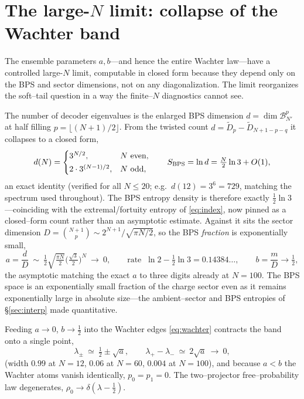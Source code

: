 \documentclass[11pt]{article}
\begin{document}
\section{The large-$N$ limit: collapse of the Wachter band}
\label{sec:largeN}

The ensemble parameters $a,b$---and hence the entire Wachter law---have a controlled large-$N$ limit,
computable in closed form because they depend only on the BPS and sector dimensions, not on any
diagonalization. The limit reorganizes the soft--tail question in a way the finite--$N$ diagnostics
cannot see.

The number of decoder eigenvalues is the enlarged BPS dimension $d=\dim\mathcal B_{N'}^p$ at half
filling $p=\lfloor(N+1)/2\rfloor$. From the twisted count $d=\widetilde D_p-\widetilde D_{N+1-p-q}$ it
collapses to a closed form,
\begin{equation}
  d(N)=\begin{cases}3^{N/2}, & N\ \text{even},\\[2pt] 2\cdot 3^{(N-1)/2}, & N\ \text{odd},\end{cases}
  \qquad S_{\rm BPS}=\ln d=\tfrac{N}{2}\ln 3+O(1),
  \label{eq:dclosed}
\end{equation}
an exact identity (verified for all $N\le20$; e.g.\ $d(12)=3^6=729$, matching the spectrum used
throughout). The BPS entropy density is therefore exactly $\tfrac12\ln3$---coinciding with the
extremal/fortuity entropy of \eqref{eq:index}, now pinned as a closed--form count rather than an
asymptotic estimate. Against it sits the sector dimension $D=\binom{N+1}{p}\sim2^{N+1}/\sqrt{\pi N/2}$,
so the BPS \emph{fraction} is exponentially small,
\begin{equation}
  a=\frac{d}{D}\ \sim\ \tfrac12\sqrt{\tfrac{\pi N}{2}}\Big(\tfrac{\sqrt3}{2}\Big)^{N}\ \longrightarrow\ 0,
  \qquad\text{rate }\ \ln2-\tfrac12\ln3=0.14384\ldots,\qquad b=\frac{m}{D}\to\tfrac12,
  \label{eq:aasy}
\end{equation}
the asymptotic matching the exact $a$ to three digits already at $N=100$. The BPS space is an
exponentially small fraction of the charge sector even as it remains exponentially large in absolute
size---the ambient--sector and BPS entropies of \S\ref{sec:interp} made quantitative.

Feeding $a\to0$, $b\to\tfrac12$ into the Wachter edges \eqref{eq:wachter} contracts the band onto a
single point,
\begin{equation}
  \lambda_\pm\ \simeq\ \tfrac12\pm\sqrt a,\qquad \lambda_+-\lambda_-\ \simeq\ 2\sqrt a\ \to\ 0,
  \label{eq:collapse}
\end{equation}
(width $0.99$ at $N=12$, $0.06$ at $N=60$, $0.004$ at $N=100$), and because $a<b$ the Wachter atoms
vanish identically, $p_0=p_1=0$. The two--projector free--probability law degenerates,
$\rho_0\to\delta(\lambda-\tfrac12)$.
\end{document}
